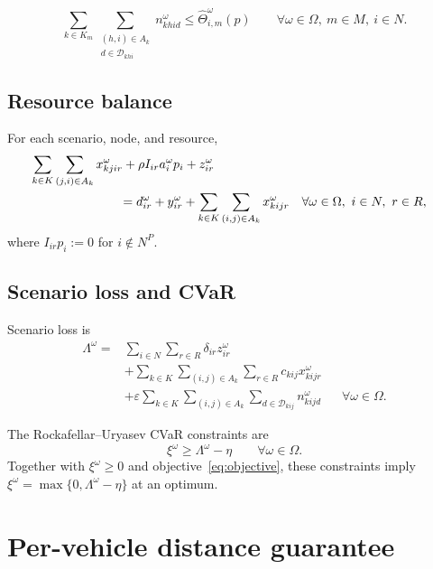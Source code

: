 \documentclass[11pt]{article}
\begin{document}
\begin{equation}
\sum_{k\in K_m}
\sum_{\substack{(h,i)\in A_k\\d\in\mathcal D_{khi}}}
n^\omega_{khid}
\leq
\widehat\Theta^\omega_{i,m}(p)
\qquad
\forall\omega\in\Omega,\ m\in M,\ i\in N.
\label{eq:node-handling}
\end{equation}

\subsection{Resource balance}

For each scenario, node, and resource,
\begin{align}
&\sum_{k\in K}
\sum_{(j,i)\in A_k}x^\omega_{kjir}
+\rho I_{ir}a^\omega_i p_i
+z^\omega_{ir}
\nonumber\\
&\hspace{25mm}=
d^\omega_{ir}
+y^\omega_{ir}
+\sum_{k\in K}
\sum_{(i,j)\in A_k}x^\omega_{kijr}
&&\forall\omega\in\Omega,\ i\in N,\ r\in R,
\label{eq:resource-balance}
\end{align}
where $I_{ir}p_i:=0$ for $i\notin N^P$.

\subsection{Scenario loss and CVaR}

Scenario loss is
\begin{align}
\Lambda^\omega
=
&\sum_{i\in N}\sum_{r\in R}
\delta_{ir}z^\omega_{ir}
\nonumber\\
&+
\sum_{k\in K}\sum_{(i,j)\in A_k}\sum_{r\in R}
c_{kij}x^\omega_{kijr}
\nonumber\\
&+
\varepsilon
\sum_{k\in K}\sum_{(i,j)\in A_k}
\sum_{d\in\mathcal D_{kij}}
n^\omega_{kijd}
&&\forall\omega\in\Omega.
\label{eq:scenario-loss}
\end{align}

The Rockafellar--Uryasev CVaR constraints are
\begin{equation}
\xi^\omega
\geq
\Lambda^\omega-\eta
\qquad
\forall\omega\in\Omega.
\label{eq:cvar-excess}
\end{equation}
Together with $\xi^\omega\geq0$ and objective~\eqref{eq:objective}, these
constraints imply
$\xi^\omega=\max\{0,\Lambda^\omega-\eta\}$ at an optimum.

\section{Per-vehicle distance guarantee}
\end{document}
